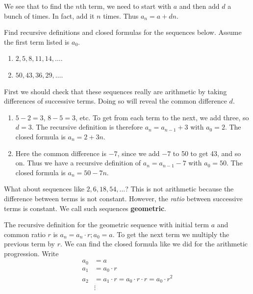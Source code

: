 \documentclass[11pt,]{book}
\newcommand{\terminology}[1]{\textbf{#1}}
\theoremstyle{ptxplainnotitle}
\theoremstyle{ptxplaintitle}
\theoremstyle{ptxdefinitionnotitle}
\theoremstyle{ptxdefinitiontitle}
\theoremstyle{ptxdefinitionnotitle}
\theoremstyle{ptxdefinitiontitle}
\theoremstyle{ptxdefinitionnotitle}
\theoremstyle{ptxdefinitiontitle}
\theoremstyle{ptxdefinitiontitlenonumber}
\theoremstyle{ptxdefinitiontitlenonumber}
\numberwithin{equation}{chapter}
\newcommand{\amp}{&}
\begin{document}
%
\par
\hypertarget{p-159}{}%
We see that to find the \(n\)th term, we need to start with \(a\) and then add \(d\) a bunch of times. In fact, add it \(n\) times. Thus \(a_n = a+dn\).%
\begin{example}\label{example-5}
\hypertarget{p-160}{}%
Find recursive definitions and closed formulas for the sequences below. Assume the first term listed is \(a_0\).%
\par
\hypertarget{p-161}{}%
\leavevmode%
\begin{enumerate}
\item\hypertarget{li-101}{}\(2, 5, 8, 11, 14, \ldots\).%
\item\hypertarget{li-102}{}\(50, 43, 36, 29, \ldots\).%
\end{enumerate}
%
\par\smallskip%
\noindent\textbf{}\hypertarget{solution-16}{}\hypertarget{p-162}{}%
First we should check that these sequences really are arithmetic by taking differences of successive terms. Doing so will reveal the common difference \(d\).%
\par
\hypertarget{p-163}{}%
\leavevmode%
\begin{enumerate}
\item\hypertarget{li-103}{}\(5-2 = 3\), \(8-5 = 3\), etc. To get from each term to the next, we add three, so \(d = 3\). The recursive definition is therefore \(a_n = a_{n-1} + 3\) with \(a_0 = 2\). The closed formula is \(a_n = 2 + 3n\).%
\item\hypertarget{li-104}{}\hypertarget{p-164}{}%
Here the common difference is \(-7\), since we add \(-7\) to 50 to get 43, and so on. Thus we have a recursive definition of \(a_n = a_{n-1} - 7\) with \(a_0 = 50\). The closed formula is \(a_n = 50 - 7n\).%
\end{enumerate}
%
\end{example}
\hypertarget{p-165}{}%
What about sequences like \(2, 6, 18, 54, \ldots\)? This is not arithmetic because the difference between terms is not constant. However, the \emph{ratio} between successive terms is constant. We call such sequences \terminology{geometric}.%
\par
\hypertarget{p-166}{}%
The recursive definition for the geometric sequence with initial term \(a\) and common ratio \(r\) is \(a_n = a_{n}\cdot r; a_0 = a\). To get the next term we multiply the previous term by \(r\). We can find the closed formula like we did for the arithmetic progression. Write%
\begin{align*}
a_0 \amp = a\\
a_1 \amp = a_0\cdot r\\
a_2 \amp = a_1 \cdot r = a_0\cdot r\cdot r = a_0\cdot r^2\\
\amp \vdots 
\end{align*}
\end{document}

